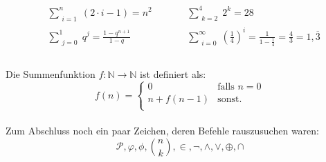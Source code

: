 \documentclass[a4paper,12pt]{article}
\begin{document}
\newcommand{\bs}[4]{\sum\limits_{\substack{#1=#2}}^{#3} #4}

\[
\begin{aligned}
&\bs{i}{1}{n}{(2 \cdot i - 1)} = n^2 \quad&&\quad \bs{k}{2}{4}{2^k} = 28 \\
&\bs{j}{0}{1}{q^j} = \frac{1 - q^{n + 1}}{1 - q} \quad&&\quad \bs{i}{0}{\infty}{\left(\frac{1}{4}\right)^i} = \frac{1}{1 - \frac{1}{4}} = \frac{4}{3} = 1,\overline{3} \\
\end{aligned}
\]\\
Die Summenfunktion $f: \mathbb{N} \rightarrow \mathbb{N}$ ist definiert als:\\
\[f(n)=\begin{cases}
        0 & \text{falls } n = 0\\
        n + f(n - 1) & \text{sonst.}\\
\end{cases}\]\\

Zum Abschluss noch ein paar Zeichen, deren Befehle rauszusuchen waren:\\
\[\mathcal{P}, \varphi, \phi, \binom{n}{k}, \in, \neg, \wedge, \vee, \oplus, \cap\]

\printbibliography
\listoffigures
\listoftables
\end{document}
